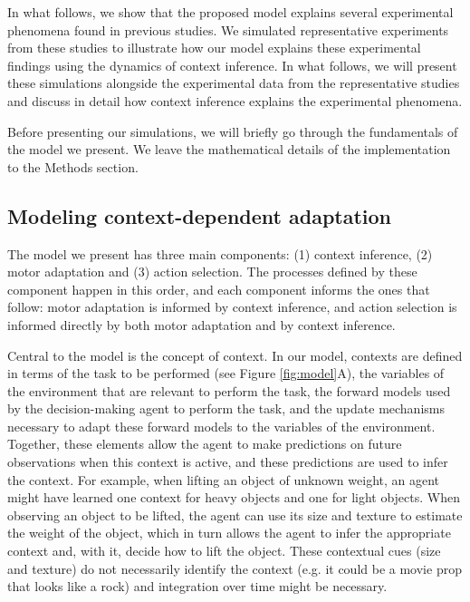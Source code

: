 \documentclass[a4paper,doc,floatsintext,natbib]{apa6}
\def \fref #1{Figure \ref{#1}}     %
\begin{document}
In what follows, we show that the proposed model explains several experimental phenomena found in previous studies. We simulated representative experiments from these studies to illustrate how our model explains these experimental findings using the dynamics of context inference. In what follows, we will present these simulations alongside the experimental data from the representative studies and discuss in detail how context inference explains the experimental phenomena.

Before presenting our simulations, we will briefly go through the fundamentals of the model we present. We leave the mathematical details of the implementation to the Methods section.

\subsection{Modeling context-dependent adaptation}
The model we present has three main components: (1) context inference, (2) motor adaptation and (3) action selection. The processes defined by these component happen in this order, and each component informs the ones that follow: motor adaptation is informed by context inference, and action selection is informed directly by both motor adaptation and by context inference.

Central to the model is the concept of context. In our model, contexts are defined in terms of the task to be performed (see \fref{fig:model}A), the variables of the environment that are relevant to perform the task, the forward models used by the decision-making agent to perform the task, and the update mechanisms necessary to adapt these forward models to the variables of the environment. Together, these elements allow the agent to make predictions on future observations when this context is active, and these predictions are used to infer the context. For example, when lifting an object of unknown weight, an agent might have learned one context for heavy objects and one for light objects. When observing an object to be lifted, the agent can use its size and texture to estimate the weight of the object, which in turn allows the agent to infer the appropriate context and, with it, decide how to lift the object. These contextual cues (size and texture) do not necessarily identify the context (e.g. it could be a movie prop that looks like a rock) and integration over time might be necessary.
\end{document}
